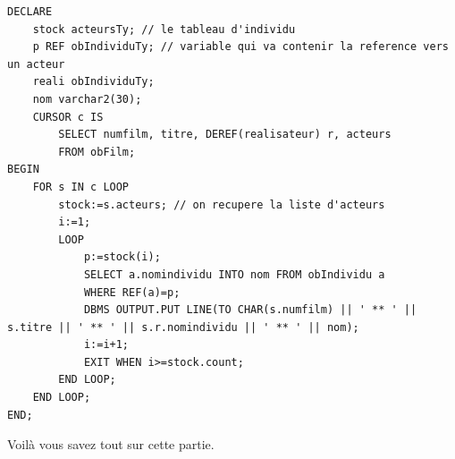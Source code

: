 \documentclass{report}
\begin{document}
\begin{lstlisting}[style=MySQLStyle]
DECLARE
	stock acteursTy; // le tableau d'individu
	p REF obIndividuTy; // variable qui va contenir la reference vers un acteur
	reali obIndividuTy;
	nom varchar2(30);
	CURSOR c IS
		SELECT numfilm, titre, DEREF(realisateur) r, acteurs
		FROM obFilm;
BEGIN
	FOR s IN c LOOP
		stock:=s.acteurs; // on recupere la liste d'acteurs
		i:=1;
		LOOP
			p:=stock(i);
			SELECT a.nomindividu INTO nom FROM obIndividu a
			WHERE REF(a)=p;
			DBMS OUTPUT.PUT LINE(TO CHAR(s.numfilm) || ' ** ' || s.titre || ' ** ' || s.r.nomindividu || ' ** ' || nom);
			i:=i+1;
			EXIT WHEN i>=stock.count;
		END LOOP;
	END LOOP;
END;
\end{lstlisting}
Voilà vous savez tout sur cette partie.
\end{document}
